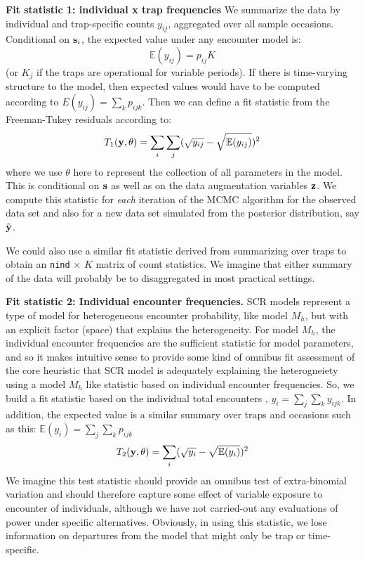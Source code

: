 {\bf Fit statistic 1: individual x trap frequencies} We summarize the
data by individual and trap-specific counts $y_{ij}$, aggregated over
all sample occasions. Conditional on ${\bf s}_{i}$, the expected value
under any encounter model is:
\[
 \mathbb{E}(y_{ij}) = p_{ij} K
\]
(or $K_{j}$ if the traps are operational for variable periods). If
there is time-varying structure to the model, then expected values
would have to be computed according to $E(y_{ij}) = \sum_{k} p_{ijk}$.
Then we can define a fit statistic from the Freeman-Tukey residuals
according to:
\[
 T_{1}({\bf y}, \theta) = \sum_{i}\sum_{j} (\sqrt{ y_{ij} } - \sqrt{ \mathbb{E}(y_{ij}) })^2
\]
where we use $\theta$ here to represent the collection of all
parameters in the model.  This is conditional on ${\bf s}$ as well as
on the data augmentation variables ${\bf z}$. We compute this
statistic for {\it each} iteration of the MCMC algorithm for the
observed data set and also for a new data set simulated from the posterior
distribution, say $\tilde{\bf y}$.

We could also use a similar fit statistic derived from summarizing
over traps to obtain an \mbox{\tt nind} $\times$ $K$ matrix of count
statistics.  We imagine that either summary of the data will probably
be to disaggregated in most practical settings.


{\bf Fit statistic 2: Individual encounter frequencies. } SCR models
represent a type of model for heterogeneous encounter probability, like model $M_h$, but with an explicit
factor (space) that explains the heterogeneity. For model $M_h$, the
individual encounter frequencies are the sufficient statistic for
model parameters, and so it makes intuitive sense to provide some kind
of omnibus fit assessment of the core heuristic that SCR model is
adequately explaining the heterogneiety using a model $M_h$ like
statistic based on individual encounter frequencies.  So, we build a
fit statistic based on the individual total encounters
\citep{russell_etal:2012}, $y_{i} = \sum_{j} \sum_{k} y_{ijk}$. In
addition, the expected value is a similar summary over traps and
occasions such as this: $\mathbb{E}(y_{i}) = \sum_{j} \sum_{k}
p_{ijk}$
\[
 T_{2}({\bf y}, \theta) = \sum_{i} (\sqrt{ y_{i} } - \sqrt{ \mathbb{E}(y_{i}) })^2
\]
We imagine this test statistic should provide an omnibus test of
extra-binomial variation and should therefore capture some effect of
variable exposure to encounter of individuals, although we have not
carried-out any evaluations of power under specific alternatives.
Obviously, in using this statistic, we lose information on departures
from the model that might only be trap or time-specific.


